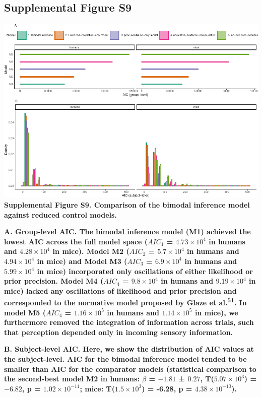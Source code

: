 \documentclass[
]{article}
\begin{document}
\newpage

\hypertarget{supplemental-figure-s9}{%
\subsection{Supplemental Figure S9}\label{supplemental-figure-s9}}

\includegraphics{modes_mouse_rev1b_files/figure-latex/Supplemental_Figure_S9-1.pdf}
\textbf{Supplemental Figure S9. Comparison of the bimodal inference
model against reduced control models.}

\textbf{A. Group-level AIC. The bimodal inference model (M1) achieved
the lowest AIC across the full model space (\(AIC_1\) =
\(\ensuremath{4.73\times 10^{4}}\) in humans and
\(\ensuremath{4.28\times 10^{4}}\) in mice). Model M2 (\(AIC_2\) =
\(\ensuremath{5.7\times 10^{4}}\) in humans and
\(\ensuremath{4.94\times 10^{4}}\) in mice) and Model M3 (\(AIC_3\) =
\(\ensuremath{6.9\times 10^{4}}\) in humans and
\(\ensuremath{5.99\times 10^{4}}\) in mice) incorporated only
oscillations of either likelihood or prior precision. Model M4
(\(AIC_4\) = \(\ensuremath{9.8\times 10^{4}}\) in humans and
\(\ensuremath{9.19\times 10^{4}}\) in mice) lacked any oscillations of
likelihood and prior precision and corresponded to the normative model
proposed by Glaze et al.\textsuperscript{51}. In model M5 (\(AIC_4\) =
\(\ensuremath{1.16\times 10^{5}}\) in humans and
\(\ensuremath{1.14\times 10^{5}}\) in mice), we furthermore removed the
integration of information across trials, such that perception depended
only in incoming sensory information.}

\textbf{B. Subject-level AIC. Here, we show the distribution of AIC
values at the subject-level. AIC for the bimodal inference model tended
to be smaller than AIC for the comparator models (statistical comparison
to the second-best model M2 in humans: \(\beta\) = \(-1.81\) ± \(0.27\),
T(\(\ensuremath{5.07\times 10^{3}}\)) = \(-6.82\), p =
\(\ensuremath{1.02\times 10^{-11}}\); mice:
T(\(\ensuremath{1.5\times 10^{3}}\)) = -6.28, p =
\(\ensuremath{4.38\times 10^{-10}}\)).}
\end{document}
